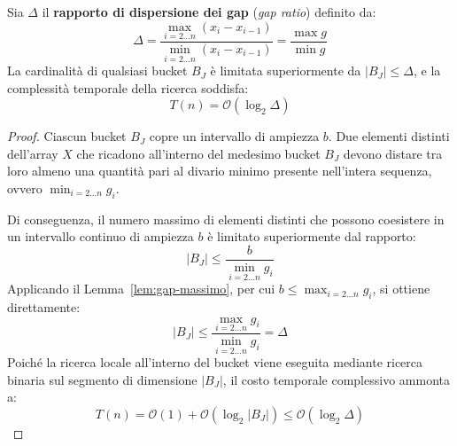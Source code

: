\begin{theorem}
\label{thm:complessita-data-aware}
Sia $\Delta$ il \textbf{rapporto di dispersione dei gap} (\textit{gap ratio}) definito da:
\begin{equation}
  \Delta = \frac{\displaystyle\max_{i=2 \dots n} (x_i - x_{i-1})}{\displaystyle\min_{i=2 \dots n} (x_i - x_{i-1})} = \frac{\max g}{\min g}
\end{equation}
La cardinalit\`a di qualsiasi bucket $B_J$ \`e limitata superiormente da $|B_J| \le \Delta$, e la complessit\`a temporale della ricerca soddisfa:
\begin{equation}
  T(n) = \mathcal{O}(\log_2 \Delta)
\end{equation}
\end{theorem}

\begin{proof}
Ciascun bucket $B_J$ copre un intervallo di ampiezza $b$. Due elementi distinti dell'array $X$ che ricadono all'interno del medesimo bucket $B_J$ devono distare tra loro almeno una quantit\`a pari al divario minimo presente nell'intera sequenza, ovvero $\min_{i=2 \dots n} g_i$.

Di conseguenza, il numero massimo di elementi distinti che possono coesistere in un intervallo continuo di ampiezza $b$ \`e limitato superiormente dal rapporto:
\begin{equation}
  |B_J| \le \frac{b}{\min_{i=2 \dots n} g_i}
\end{equation}
Applicando il Lemma~\ref{lem:gap-massimo}, per cui $b \le \max_{i=2 \dots n} g_i$, si ottiene direttamente:
\begin{equation}
  |B_J| \le \frac{\max_{i=2 \dots n} g_i}{\min_{i=2 \dots n} g_i} = \Delta
\end{equation}
Poich\'e la ricerca locale all'interno del bucket viene eseguita mediante ricerca binaria sul segmento di dimensione $|B_J|$, il costo temporale complessivo ammonta a:
\begin{equation}
  T(n) = \mathcal{O}(1) + \mathcal{O}(\log_2 |B_J|) \le \mathcal{O}(\log_2 \Delta)
\end{equation}
\end{proof}

